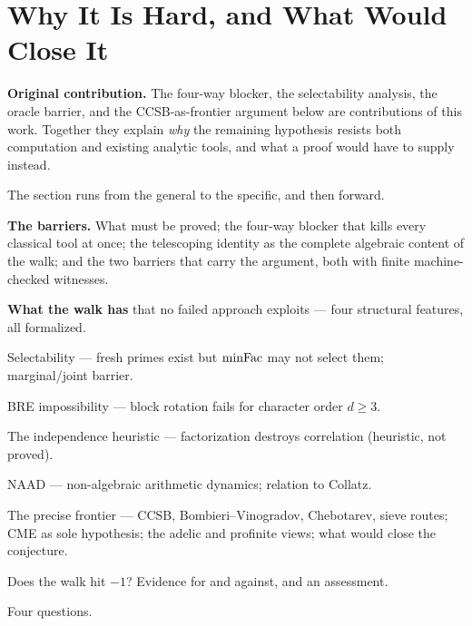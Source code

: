 \section{Why It Is Hard, and What Would Close It}
\label{sec:hard}
\label{sec:open}

\noindent\textbf{Original contribution.}\enspace
The four-way blocker, the selectability analysis, the oracle barrier, and
the CCSB-as-frontier argument below are contributions of this work.
Together they explain
\emph{why} the remaining hypothesis resists both computation and existing
analytic tools, and what a proof would have to supply instead.

\begin{roadmap}
The section runs from the general to the specific, and then forward.
\begin{description}[nosep,leftmargin=2em,font=\normalfont]
\item[\S\ref{sec:four-way}] \textbf{The barriers.}  What must be proved; the four-way blocker that kills every classical tool at once; the telescoping identity as the complete algebraic content of the walk; and the two barriers that carry the argument, both with finite machine-checked witnesses.
\item[\S\ref{sec:walk-features}] \textbf{What the walk has} that no failed approach exploits --- four structural features, all formalized.
\item[\S\ref{sec:selectability}] Selectability --- fresh primes exist but $\mathrm{minFac}$ may not select them; marginal/joint barrier.
\item[\S\ref{sec:bre-impossibility}] BRE impossibility --- block rotation fails for character order $d \geq 3$.
\item[\S\ref{sec:hash-heuristic}] The independence heuristic --- factorization destroys correlation (heuristic, not proved).
\item[\S\ref{sec:naad}] NAAD --- non-algebraic arithmetic dynamics; relation to Collatz.
\item[\S\ref{sec:precise-frontier}] The precise frontier --- CCSB, Bombieri--Vinogradov, Chebotarev, sieve routes; CME as sole hypothesis; the adelic and profinite views; what would close the conjecture.
\item[\S\ref{sec:does-it-hit}] Does the walk hit $-1$?  Evidence for and against, and an assessment.
\item[\S\ref{sec:four-questions}] Four questions.
\end{description}
\end{roadmap}

